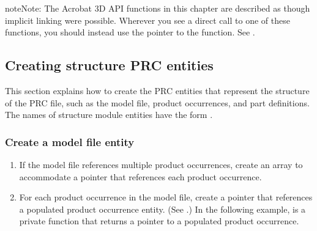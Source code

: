 \documentclass[letterpaper,12pt,english,openany,oneside]{sphinxmanual}
\begin{document}
\begin{sphinxVerbatim}[commandchars=\\\{\}]
\end{sphinxVerbatim}

\begin{sphinxadmonition}{note}{Note:}
The Acrobat 3D API functions in this chapter are described as though implicit linking were possible. Wherever you see a direct call to one of these functions, you should instead use the pointer to the function. See .
\end{sphinxadmonition}


\subsection{Creating structure PRC entities}
\label{\detokenize{Plugins_A3D_API:creating-structure-prc-entities}}
This section explains how to create the PRC entities that represent the structure of the PRC file, such as the model file, product occurrences, and part definitions. The names of structure module entities have the form  .


\subsubsection{Create a model file entity}
\label{\detokenize{Plugins_A3D_API:create-a-model-file-entity}}\begin{enumerate}
%
\item {} 
If the model file references multiple product occurrences, create an array to accommodate a pointer that references each product occurrence.

\item {} 
For each product occurrence in the model file, create a pointer that references a populated product occurrence entity. (See .) In the following example,  is a private function that returns a pointer to a populated product occurrence.

\end{enumerate}
\end{document}

